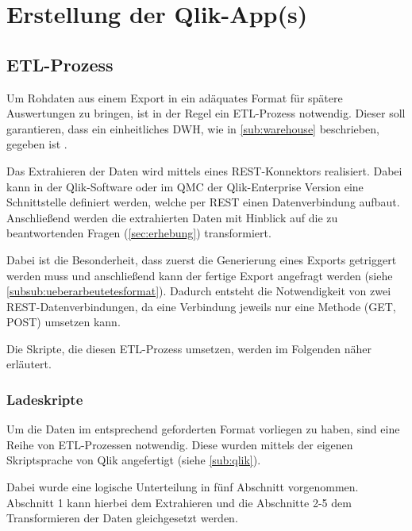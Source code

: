 
\section{Erstellung der Qlik-App(s)}
\label{sec:erstellung}
\subsection{ETL-Prozess}
\label{sub:etl}
Um Rohdaten aus einem Export in ein adäquates Format für spätere Auswertungen zu bringen, ist in der Regel ein \gls{ETL}-Prozess notwendig.
Dieser soll garantieren, dass ein einheitliches \gls{DWH}, wie in \ref{sub:warehouse} beschrieben, gegeben ist \cite[S.49]{Gabriel.2011}.

Das Extrahieren der Daten wird mittels eines \gls{REST}-Konnektors realisiert.
Dabei kann in der Qlik-Software oder im \gls{QMC} der Qlik-Enterprise Version eine Schnittstelle definiert werden, welche per REST einen Datenverbindung aufbaut.
Anschließend werden die extrahierten Daten mit Hinblick auf die zu beantwortenden Fragen (\ref{sec:erhebung}) transformiert.

Dabei ist die Besonderheit, dass zuerst die Generierung eines Exports getriggert werden muss und anschließend kann der fertige Export angefragt werden (siehe \ref{subsub:ueberarbeutetesformat}).
Dadurch entsteht die Notwendigkeit von zwei REST-Datenverbindungen, da eine Verbindung jeweils nur eine Methode (GET, POST) umsetzen kann.

Die Skripte, die diesen ETL-Prozess umsetzen, werden im Folgenden näher erläutert.

\subsubsection{Ladeskripte}
\label{subsub:scripts}

Um die Daten im entsprechend geforderten Format vorliegen zu haben, sind eine Reihe von \gls{ETL}-Prozessen notwendig.
Diese wurden mittels der eigenen Skriptsprache von Qlik angefertigt (siehe \ref{sub:qlik}).

Dabei wurde eine logische Unterteilung in fünf Abschnitt vorgenommen.
Abschnitt 1 kann hierbei dem Extrahieren und die Abschnitte 2-5 dem Transformieren der Daten gleichgesetzt werden.

